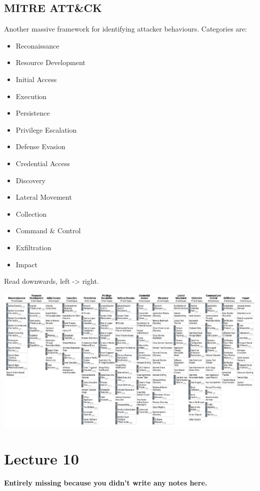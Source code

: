 \documentclass[12pt]{report}
\begin{document}
\pagebreak

\section{MITRE ATT\&CK}
Another massive framework for identifying attacker behaviours. Categories are:
\begin{multicols}{3}
\begin{itemize}
	\item Reconaissance
	\item Resource Development
	\item Initial Access
	\item Execution
	\item Persistence
	\item Privilege Escalation
	\item Defense Evasion
	\item Credential Access
	\item Discovery
	\item Lateral Movement
	\item Collection
	\item Command \& Control
	\item Exfiltration
	\item Impact
\end{itemize}
\end{multicols}
\vspace{5pt}
\footnotesize\begin{center}
	Read downwards, left -> right.
\end{center}\normalsize

\vspace{10pt}
\includegraphics[width=.95\linewidth]{MITRE.png}

\chapter{Lecture 10}
\begin{center}\large\textbf{Entirely missing because you didn't write any notes here.}\normalsize\end{center}
\end{document}

